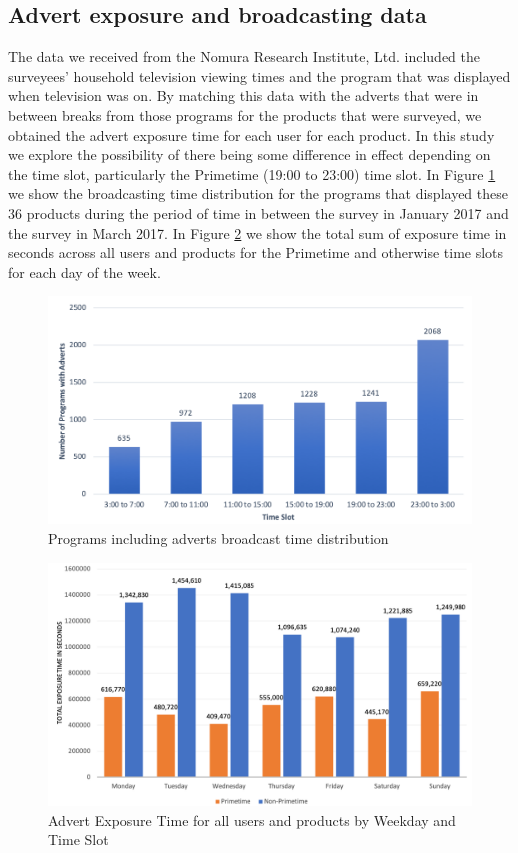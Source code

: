 \documentclass[review]{elsarticle}
\begin{document}
\subsection{Advert exposure and broadcasting data}
\label{advert_broadcast_dist}

The data we received from the Nomura Research Institute, Ltd. included the surveyees' household television viewing times and the program that was displayed when television was on. By matching this data with the adverts that were in between breaks from those programs for the products that were surveyed, we obtained the advert exposure time for each user for each product. In this study we explore the possibility of there being some difference in effect depending on the time slot, particularly the Primetime (19:00 to 23:00) time slot. In Figure \ref{fig:broadcast_dist} we show the broadcasting time distribution for the programs that displayed these 36 products during the period of time in between the survey in January 2017 and the survey in March 2017. In Figure \ref{fig:exposure_dist} we show the total sum of exposure time in seconds across all users and products for the Primetime and otherwise time slots for each day of the week.


\begin{figure}[htp]
\centering
\includegraphics[width=35em]{figures/broadcast_distributions.png}
\caption{Programs including adverts broadcast time distribution}
\label{fig:broadcast_dist}
\end{figure} 

\begin{figure}[htp]
\centering
\includegraphics[width=35em]{figures/exposure_dist.png}
\caption{Advert Exposure Time for all users and products by Weekday and Time Slot}
\label{fig:exposure_dist}
\end{figure} 
\end{document}
